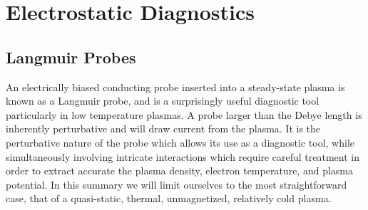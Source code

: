 \documentclass{jpp}
\begin{document}
\section{Electrostatic Diagnostics}

\subsection{Langmuir Probes}

An electrically biased conducting probe inserted into a steady-state plasma is known as a Langmuir probe, and is a surprisingly useful diagnostic tool particularly in low temperature plasmas. A probe larger than the Debye length is inherently perturbative and will draw current from the plasma. It is the perturbative nature of the probe which allows its use as a diagnostic tool, while simultaneously involving intricate interactions which require careful treatment in order to extract accurate the plasma density, electron temperature, and plasma potential. In this summary we will limit ourselves to the most straightforward case, that of a quasi-static, thermal, unmagnetized, relatively cold plasma.
\end{document}
